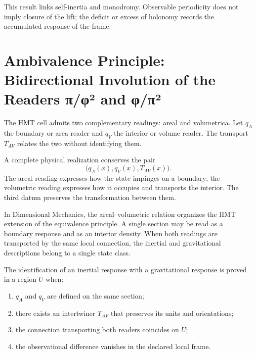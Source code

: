 This result links self-inertia and monodromy. Observable periodicity does not
imply closure of the lift; the deficit or excess of holonomy records the
accumulated response of the frame.

\section{Ambivalence Principle: Bidirectional Involution of the Readers π/φ² and φ/π²}

The HMT cell admits two complementary readings: areal and volumetrica. Let
\(q_A\) the boundary or area reader and \(q_V\) the interior or
volume reader. The transport \(T_{AV}\) relates the two without identifying them.

\begin{principle}
A complete physical realization conserves the pair
\begin{equation}
 \bigl(q_A(x),q_V(x),T_{AV}(x)\bigr).
 \label{eq:ambivalencia-av}
\end{equation}
The areal reading expresses how the state impinges on a boundary; the
volumetric reading expresses how it occupies and transports the interior. The third datum
preserves the transformation between them.
\end{principle}

In Dimensional Mechanics, the areal--volumetric relation organizes the
HMT extension of the equivalence principle. A single section may be read
as a boundary response and as an interior density. When both readings
are transported by the same local connection, the inertial and
gravitational descriptions belong to a single state class.

\begin{criterion}
The identification of an inertial response with a gravitational response
is proved in a region \(U\) when:
\begin{enumerate}
 \item \(q_A\) and \(q_V\) are defined on the same section;
 \item there exists an intertwiner \(T_{AV}\) that preserves its units and
       orientations;
 \item the connection transporting both readers coincides on \(U\);
 \item the observational difference vanishes in the declared local frame.
\end{enumerate}
\end{criterion}

